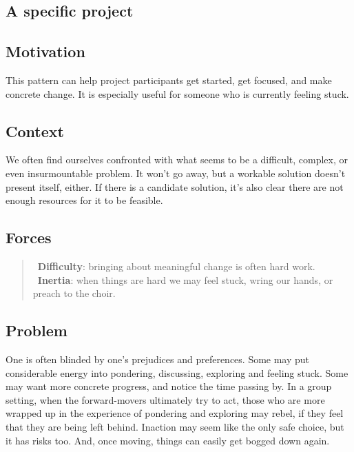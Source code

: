 \hypertarget{a-specific-project}{%
\subsection{A specific project}\label{a-specific-project}}

\hypertarget{motivation}{%
\subsection{Motivation}\label{motivation}}

This pattern can help project participants get started, get focused, and
make concrete change. It is especially useful for someone who is
currently feeling stuck.

\hypertarget{context}{%
\subsection{Context}\label{context}}

We often find ourselves confronted with what seems to be a difficult,
complex, or even insurmountable problem. It won't go away, but a
workable solution doesn't present itself, either. If there is a
candidate solution, it's also clear there are not enough resources for
it to be feasible.

\hypertarget{forces}{%
\subsection{Forces}\label{forces}}

\begin{quote}
\Sdifficulty\ \textbf{Difficulty}: bringing about meaningful change is often hard work.\\
\Sinertia\ \textbf{Inertia}: when things are hard we may feel stuck, wring our hands, or preach to the choir.
\end{quote}

\hypertarget{problem}{%
\subsection{Problem}\label{problem}}

One is often blinded by one's prejudices and preferences. Some may put
considerable energy into pondering, discussing, exploring and feeling
stuck. Some may want more concrete progress, and notice the time passing
by. In a group setting, when the forward-movers ultimately try to act,
those who are more wrapped up in the experience of pondering and
exploring may rebel, if they feel that they are being left behind.
Inaction may seem like the only safe choice, but it has risks too. And,
once moving, things can easily get bogged down again.

